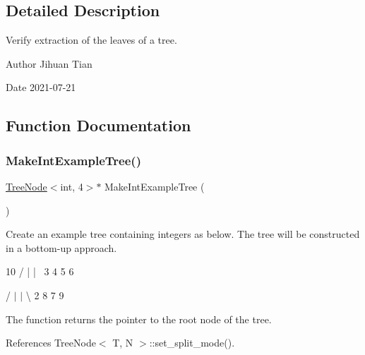 \subsection{Detailed Description}
Verify extraction of the leaves of a tree. 

\begin{DoxyAuthor}{Author}
Jihuan Tian 
\end{DoxyAuthor}
\begin{DoxyDate}{Date}
2021-\/07-\/21 
\end{DoxyDate}


\subsection{Function Documentation}
\mbox{\label{quad-tree-get-leaves_8cc_a403caebc7e08d6f14b584539580851d5}} 
\subsubsection{\texorpdfstring{Make\+Int\+Example\+Tree()}{MakeIntExampleTree()}}
{\footnotesize\ttfamily \hyperlink{classTreeNode}{Tree\+Node}$<$int, 4$>$$\ast$ Make\+Int\+Example\+Tree (\begin{DoxyParamCaption}{ }\end{DoxyParamCaption})}

Create an example tree containing integers as below. The tree will be constructed in a bottom-\/up approach. \begin{DoxyVerb}      10
  /  |  |  \
 3   4  5   6
\end{DoxyVerb}
 / $\vert$ $\vert$ \textbackslash{} 2 8 7 9

The function returns the pointer to the root node of the tree. 

References Tree\+Node$<$ T, N $>$\+::set\+\_\+split\+\_\+mode().

